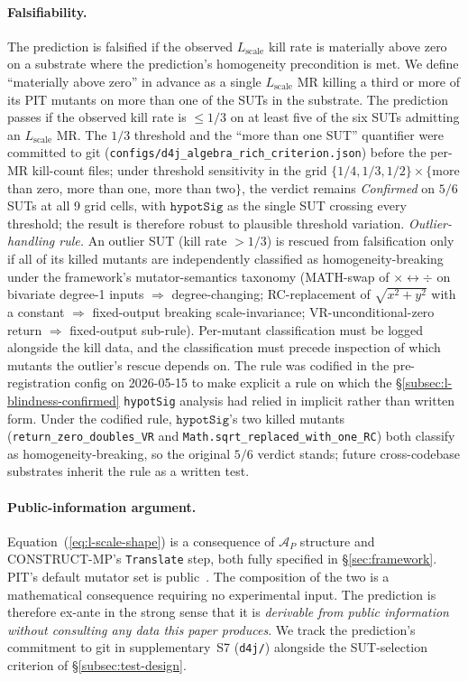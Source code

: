\documentclass[manuscript]{acmart}
\begin{document}
\paragraph{Falsifiability.}
The prediction is falsified if the observed
$L_{\mathrm{scale}}$ kill rate is materially above zero on a substrate
where the prediction's homogeneity precondition is met. We define
``materially above zero'' in advance as a single $L_{\mathrm{scale}}$
MR killing a third or more of its PIT mutants on more than one of the
SUTs in the substrate. The prediction passes if the observed kill
rate is $\le 1/3$ on at least five of the six SUTs admitting an
$L_{\mathrm{scale}}$ MR. The $1/3$ threshold and the ``more than one
SUT'' quantifier were committed to git
(\texttt{configs/d4j\_algebra\_rich\_criterion.json}) before the
per-MR kill-count files; under threshold sensitivity in the grid
$\{1/4, 1/3, 1/2\} \times \{$more than zero, more than one, more
than two$\}$, the verdict remains \emph{Confirmed} on $5/6$ SUTs at
all 9 grid cells, with $\texttt{hypotSig}$ as the single SUT
crossing every threshold; the result is therefore robust to
plausible threshold variation. \emph{Outlier-handling rule.} An
outlier SUT (kill rate $> 1/3$) is rescued from falsification only
if all of its killed mutants are independently classified as
homogeneity-breaking under the framework's mutator-semantics
taxonomy (MATH-swap of $\times \leftrightarrow \div$ on bivariate
degree-1 inputs $\Rightarrow$ degree-changing; RC-replacement of
$\sqrt{x^2 + y^2}$ with a constant $\Rightarrow$ fixed-output
breaking scale-invariance; VR-unconditional-zero return
$\Rightarrow$ fixed-output sub-rule). Per-mutant classification
must be logged alongside the kill data, and the classification
must precede inspection of which mutants the outlier's rescue
depends on. The rule was codified in the pre-registration config
on 2026-05-15 to make explicit a rule on which the
\S\ref{subsec:l-blindness-confirmed} \texttt{hypotSig} analysis had
relied in implicit rather than written form. Under the
codified rule, $\texttt{hypotSig}$'s two killed mutants
(\texttt{return\_zero\_doubles\_VR} and
\texttt{Math.sqrt\_replaced\_with\_one\_RC}) both classify as
homogeneity-breaking, so the original $5/6$ verdict stands; future
cross-codebase substrates inherit the rule as a written test.

\paragraph{Public-information argument.}
Equation~(\ref{eq:l-scale-shape}) is a consequence of $\mathcal{A}_P$
structure and CONSTRUCT-MP's \texttt{Translate} step, both fully
specified in \S\ref{sec:framework}. PIT's default mutator set is
public~\cite{Coles2016PIT}. The composition of the two is a
mathematical consequence requiring no experimental input. The
prediction is therefore ex-ante in the strong sense that it is
\emph{derivable from public information without consulting any data
this paper produces}. We track the prediction's commitment to
git in supplementary~S7 (\texttt{d4j/}) alongside the SUT-selection
criterion of \S\ref{subsec:test-design}.
\end{document}
